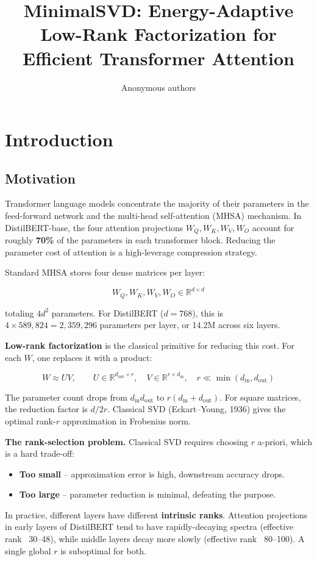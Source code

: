 \title{\textbf{MinimalSVD: Energy-Adaptive Low-Rank Factorization for Efficient Transformer Attention}}

\author{Anonymous authors}



\section{Introduction}

\subsection{Motivation}

Transformer language models concentrate the majority of their parameters in 
the feed-forward network and the multi-head self-attention (MHSA) mechanism. 
In DistilBERT-base, the four attention projections $W_Q, W_K, W_V, W_O$ 
account for roughly \textbf{70\%} of the parameters in each transformer block. 
Reducing the parameter cost of attention is a high-leverage compression 
strategy.

Standard MHSA stores four dense matrices per layer:

\[
W_Q, W_K, W_V, W_O \in \mathbb{R}^{d \times d}
\tag{1.1}
\]

totaling $4 d^2$ parameters. For DistilBERT ($d = 768$), this is 
$4 \times 589{,}824 = 2{,}359{,}296$ parameters per layer, or 14.2M across 
six layers.

\textbf{Low-rank factorization} is the classical primitive for reducing this cost. 
For each $W$, one replaces it with a product:

\[
W \approx U V, \qquad
U \in \mathbb{R}^{d_\text{out} \times r}, \quad
V \in \mathbb{R}^{r \times d_\text{in}}, \quad r \ll \min(d_\text{in}, d_\text{out})
\tag{1.2}
\]

The parameter count drops from $d_\text{in} d_\text{out}$ to 
$r(d_\text{in} + d_\text{out})$. For square matrices, the reduction factor is 
$d / 2r$. Classical SVD (Eckart--Young, 1936) gives the optimal rank-$r$ 
approximation in Frobenius norm.

\textbf{The rank-selection problem.} Classical SVD requires choosing $r$ 
a-priori, which is a hard trade-off:

\begin{itemize}
\item \textbf{Too small} -- approximation error is high, downstream accuracy drops.
\item \textbf{Too large} -- parameter reduction is minimal, defeating the purpose.

\end{itemize}
In practice, different layers have different \textbf{intrinsic ranks}. Attention 
projections in early layers of DistilBERT tend to have rapidly-decaying 
spectra (effective rank ~30--48), while middle layers decay more slowly 
(effective rank ~80--100). A single global $r$ is suboptimal for both.

